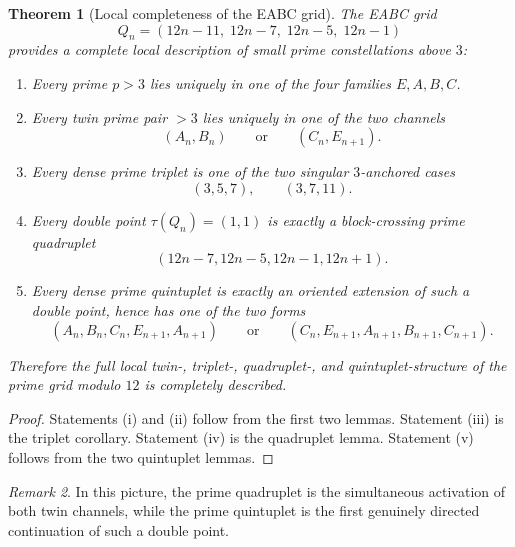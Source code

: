 \documentclass[11pt,a4paper]{article}
\newtheorem{theorem}{Theorem}
\theoremstyle{definition}
\theoremstyle{remark}
\newtheorem{remark}[theorem]{Remark}
\begin{document}
	\begin{theorem}[Local completeness of the EABC grid]
		The EABC grid
		\[
		Q_n=(12n-11,\;12n-7,\;12n-5,\;12n-1)
		\]
		provides a complete local description of small prime constellations above \(3\):
		
		\begin{enumerate}[label=\textup{(\roman*)}]
			\item Every prime \(p>3\) lies uniquely in one of the four families \(E,A,B,C\).
			\item Every twin prime pair \(>3\) lies uniquely in one of the two channels
			\[
			(A_n,B_n)
			\qquad\text{or}\qquad
			(C_n,E_{n+1}).
			\]
			\item Every dense prime triplet is one of the two singular \(3\)-anchored cases
			\[
			(3,5,7),\qquad (3,7,11).
			\]
			\item Every double point \(\tau(Q_n)=(1,1)\) is exactly a block-crossing prime quadruplet
			\[
			(12n-7,12n-5,12n-1,12n+1).
			\]
			\item Every dense prime quintuplet is exactly an oriented extension of such a double point, hence has one of the two forms
			\[
			(A_n,B_n,C_n,E_{n+1},A_{n+1})
			\qquad\text{or}\qquad
			(C_n,E_{n+1},A_{n+1},B_{n+1},C_{n+1}).
			\]
		\end{enumerate}
		
		Therefore the full local twin-, triplet-, quadruplet-, and quintuplet-structure of the prime grid modulo \(12\) is completely described.
	\end{theorem}
	
	\begin{proof}
		Statements \textup{(i)} and \textup{(ii)} follow from the first two lemmas. Statement \textup{(iii)} is the triplet corollary. Statement \textup{(iv)} is the quadruplet lemma. Statement \textup{(v)} follows from the two quintuplet lemmas.
	\end{proof}
	
	\begin{remark}
		In this picture, the prime quadruplet is the simultaneous activation of both twin channels, while the prime quintuplet is the first genuinely directed continuation of such a double point.
	\end{remark}
	
\end{document}
